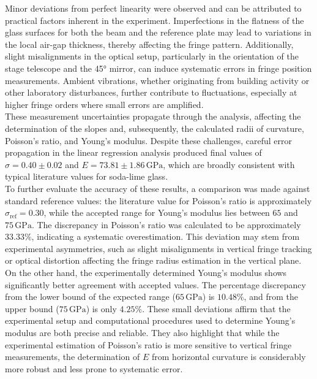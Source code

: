 \documentclass[a4paper,11pt]{article}
\begin{document}
Minor deviations from perfect linearity were observed and can be attributed to practical factors inherent in the experiment. Imperfections in the flatness of the glass surfaces for both the beam and the reference plate may lead to variations in the local air-gap thickness, thereby affecting the fringe pattern. Additionally, slight misalignments in the optical setup, particularly in the orientation of the stage telescope and the 45° mirror, can induce systematic errors in fringe position measurements. Ambient vibrations, whether originating from building activity or other laboratory disturbances, further contribute to fluctuations, especially at higher fringe orders where small errors are amplified.\\

These measurement uncertainties propagate through the analysis, affecting the determination of the slopes and, subsequently, the calculated radii of curvature, Poisson's ratio, and Young's modulus. Despite these challenges, careful error propagation in the linear regression analysis produced final values of \(\sigma = 0.40 \pm 0.02\) and \(E = 73.81 \pm 1.86\,\mathrm{GPa}\), which are broadly consistent with typical literature values for soda-lime glass.\\

To further evaluate the accuracy of these results, a comparison was made against standard reference values: the literature value for Poisson's ratio is approximately \(\sigma_{\text{ref}} = 0.30\), while the accepted range for Young's modulus lies between \(65\) and \(75\,\mathrm{GPa}\). The discrepancy in Poisson's ratio was calculated to be approximately \(33.33\%\), indicating a systematic overestimation. This deviation may stem from experimental asymmetries, such as slight misalignments in vertical fringe tracking or optical distortion affecting the fringe radius estimation in the vertical plane.\\

On the other hand, the experimentally determined Young's modulus shows significantly better agreement with accepted values. The percentage discrepancy from the lower bound of the expected range (\(65\,\mathrm{GPa}\)) is \(10.48\%\), and from the upper bound (\(75\,\mathrm{GPa}\)) is only \(4.25\%\). These small deviations affirm that the experimental setup and computational procedures used to determine Young's modulus are both precise and reliable. They also highlight that while the experimental estimation of Poisson's ratio is more sensitive to vertical fringe measurements, the determination of \(E\) from horizontal curvature is considerably more robust and less prone to systematic error.\\
\end{document}
